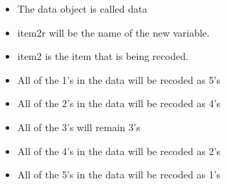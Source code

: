 \documentclass[
]{book}
\providecommand{\tightlist}{%
  \setlength{\itemsep}{0pt}\setlength{\parskip}{0pt}}
\begin{document}
\begin{itemize}
\tightlist
\item
  The data object is called data\\
\item
  item2r will be the name of the new variable.\\
\item
  item2 is the item that is being recoded.\\
\item
  All of the 1's in the data will be recoded as 5's\\
\item
  All of the 2's in the data will be recoded as 4's\\
\item
  All of the 3's will remain 3's\\
\item
  All of the 4's in the data will be recoded as 2's\\
\item
  All of the 5's in the data will be recoded as 1's
\end{itemize}

  
\end{document}
